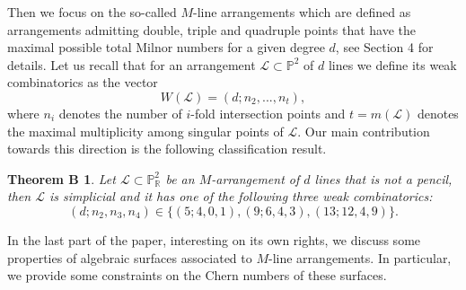 \documentclass[12pt]{article}
\theoremstyle{plain}
\newtheorem*{theoremB}{Theorem B}
\theoremstyle{definition}
\begin{document}
Then we focus on the so-called $M$-line arrangements which are defined as arrangements admitting double, triple and quadruple points that have the maximal possible total Milnor numbers for a given degree $d$, see Section 4 for details. Let us recall that for an arrangement $\mathcal{L} \subset \mathbb{P}^{2}$ of $d$ lines we define its weak combinatorics as the vector
$$W(\mathcal{L}) = (d;n_{2}, ..., n_{t}),$$
where $n_{i}$ denotes the number of $i$-fold intersection points and $t = m(\mathcal{L})$ denotes the maximal multiplicity among singular points of $\mathcal{L}$. Our main contribution towards this direction is the following classification result.
\begin{theoremB}
Let $\mathcal{L}\subset \mathbb{P}^{2}_{\mathbb{R}}$ be an $M$-arrangement of $d$ lines that is not a pencil, then $\mathcal{L}$ is simplicial and it has one of the following three weak combinatorics:
$$(d;n_{2},n_{3},n_{4}) \in \{(5;4,0,1),(9;6,4,3),(13;12,4,9)\}.$$
\end{theoremB}
In the last part of the paper, interesting on its own rights, we discuss some properties of algebraic surfaces associated to $M$-line arrangements. In particular, we provide some constraints on the Chern numbers of these surfaces.
\end{document}
